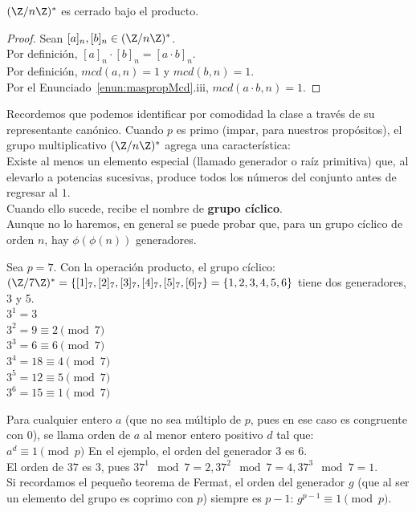 \begin{enunciado}
$(\Z/n\Z)^{*}$ es cerrado bajo el producto.
\end{enunciado}

 \begin{proof}
 Sean $[a]_n,[b]_n \in (\Z/n\Z)^{*}$. \\
 Por definición,  $[a]_n \cdot [b]_n = [a \cdot b]_n$. \\
 Por definición, $mcd(a,n)=1$ y $mcd(b,n)=1$. \\
 Por el Enunciado~\ref{enun:maspropMcd}.iii, $mcd(a \cdot b,n)=1.$
 \end{proof}

Recordemos que podemos identificar por comodidad la clase a través de su representante canónico.
Cuando $p$ es primo (impar, para nuestros propósitos), el grupo multiplicativo $(\Z/n\Z)^{*}$ agrega una característica: \\
Existe al menos un elemento especial (llamado generador o raíz primitiva) que, al elevarlo a potencias sucesivas, produce todos los números del conjunto antes de regresar al $1$. \\
Cuando ello sucede, recibe el nombre de \textbf{grupo cíclico}. \\
Aunque no lo haremos, en general se puede probar que, para un grupo cíclico de orden $n$, hay $\phi(\phi(n))$ generadores.

\begin{ejemplo}
Sea $p=7$.
Con la operación producto, el grupo cíclico: \\
$(\Z/7\Z)^{*} = \{ [1]_7,[2]_7,[3]_7,[4]_7,[5]_7,[6]_7 \} = \{ 1,2,3,4,5,6 \}$
tiene dos generadores, 3 y 5. \\
$3^1 = 3$ \\
$3^2 = 9 \equiv 2 \pmod 7$ \\
$3^3 = 6 \equiv 6 \pmod 7$ \\
$3^4 = 18 \equiv 4 \pmod 7$ \\
$3^5 = 12 \equiv 5 \pmod 7$ \\
$3^6 = 15 \equiv 1 \pmod 7$ 
\end{ejemplo}

Para cualquier entero $a$ (que no sea múltiplo de $p$, pues en ese caso es congruente con $0$), se llama orden de $a$ al menor entero positivo $d$ tal que: \\
$a^d \equiv 1 \pmod p$
En el ejemplo, el orden del generador $3$ es $6$. \\
El orden de $37$ es $3$, pues $37^1 \mod 7 = 2, 37^2 \mod 7 = 4, 37^3 \mod 7 = 1$. \\
Si recordamos el pequeño teorema de Fermat, el orden del generador $g$ (que al ser un elemento del grupo es coprimo con $p$) siempre es $p-1$: $g^{p-1} \equiv 1 \pmod p$. \\

